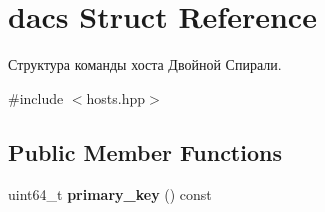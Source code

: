 \hypertarget{structdacs}{}\section{dacs Struct Reference}
\label{structdacs}


Структура команды хоста Двойной Спирали.  




{\ttfamily \#include $<$hosts.\+hpp$>$}

\subsection*{Public Member Functions}
\begin{DoxyCompactItemize}
\item 
\mbox{\label{structdacs_adbff85b09633fb360200e8571993d43f}} 
uint64\+\_\+t {\bfseries primary\+\_\+key} () const
\end{DoxyCompactItemize}

